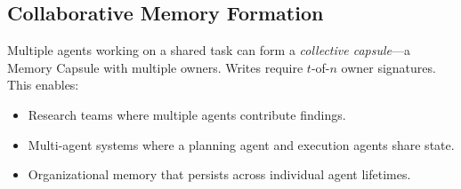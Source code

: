 \subsection{Collaborative Memory Formation}

Multiple agents working on a shared task can form a \emph{collective capsule}---a Memory Capsule with multiple \DID{} owners. Writes require $t$-of-$n$ owner signatures. This enables:

\begin{itemize}
    \item Research teams where multiple agents contribute findings.
    \item Multi-agent systems where a planning agent and execution agents share state.
    \item Organizational memory that persists across individual agent lifetimes.
\end{itemize}

